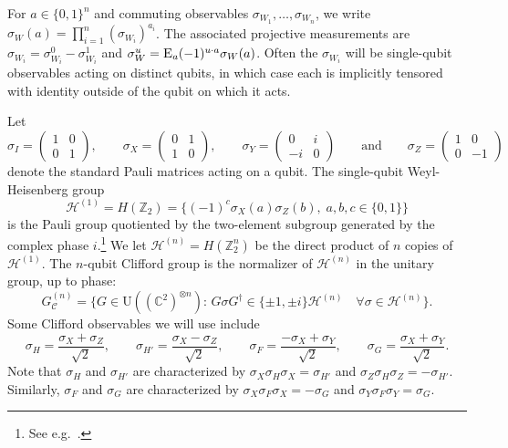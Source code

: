 \documentclass[11pt]{article}
\theoremstyle{remark}
\theoremstyle{definition}
\newcommand{\Id}{\ensuremath{\mathop{\rm Id}\nolimits}}
\newcommand{\Es}[1]{\ensuremath{\mathop{\textsc{E}}_{#1}}}
\newcommand{\C}{\ensuremath{\mathbb{C}}}
\newcommand{\Z}{\ensuremath{\mathbb{Z}}}
\newcommand{\setft}[1]{\mathrm{#1}}
\newcommand{\Unitary}{\setft{U}}
\newcommand{\heisg}{{\mathcal{H}^{(1)}}}
\newcommand{\heisgn}{{\mathcal{H}^{(n)}}}
\newcommand{\cliffordn}{G_\mathcal{C}^{(n)}}
\newcommand{\paulign}{G_{\mathcal{P}}^{(n)}}
\begin{document}
For $a\in\{0,1\}^n$ and commuting observables $\sigma_{W_1},\ldots,\sigma_{W_n}$, we write $\sigma_W(a) = \prod_{i=1}^n (\sigma_{W_i})^{a_i}$. The associated projective measurements are $\sigma_{W_i} = \sigma_{W_i}^0 - \sigma_{W_i}^1$ and $\sigma_W^u = \Es{a} (-1)^{u\cdot a} \sigma_W(a)$.  Often the $\sigma_{W_i}$ will be single-qubit observables acting on distinct qubits, in which case each is implicitly tensored with identity outside of the qubit on which it acts. 

Let 
\begin{equation}\label{eq:pauli-matrix}
\sigma_I = \begin{pmatrix} 1 & 0 \\ 0 & 1 \end{pmatrix},\qquad \sigma_X = \begin{pmatrix} 0 & 1 \\ 1 & 0 \end{pmatrix},\qquad \sigma_Y = \begin{pmatrix} 0 & i \\ -i & 0 \end{pmatrix}\qquad\text{and}\qquad \sigma_Z = \begin{pmatrix} 1 & 0 \\ 0 & -1\end{pmatrix}
\end{equation}
denote the standard Pauli matrices acting on a qubit. The single-qubit Weyl-Heisenberg group
$$\heisg = H(\Z_2)=\Big\{(-1)^c\sigma_X(a)\sigma_Z(b),\;a,b,c\in\{0,1\}\Big\} $$
is the Pauli group quotiented by the two-element subgroup generated by the complex phase $i$.\footnote{See e.g.~\cite[Section II.A]{gross2006hudson}.} We  let $\heisgn = H(\Z_2^n)$ be the direct product of $n$ copies of $\heisg$.  
The $n$-qubit Clifford group is the normalizer of $\heisgn$ in the unitary group, up to phase: 
$$\cliffordn = \big\{G\in\Unitary((\C^2)^{\otimes n}):\, G \sigma G^\dagger \in \{\pm 1,\pm i\}\heisgn \quad\forall \sigma \in \heisgn\big\}.$$
Some Clifford observables we will use include 
$$ \sigma_H = \frac{\sigma_X+\sigma_Z}{\sqrt{2}},\qquad \sigma_{H'} = \frac{\sigma_X-\sigma_Z}{\sqrt{2}},\qquad \sigma_F = \frac{-\sigma_X+\sigma_Y}{\sqrt{2}},\qquad \sigma_{G} = \frac{\sigma_X+\sigma_Y}{\sqrt{2}}.$$
Note that  $\sigma_H$ and $\sigma_{H'}$ are characterized by $\sigma_X \sigma_H \sigma_X = \sigma_{H'}$ and $\sigma_Z \sigma_H \sigma_Z = -\sigma_{H'}$. Similarly, $\sigma_F$ and $\sigma_G$ are characterized by $\sigma_X \sigma_F \sigma_X = -\sigma_G$ and $\sigma_Y \sigma_F \sigma_Y = \sigma_G$. 
\end{document}
